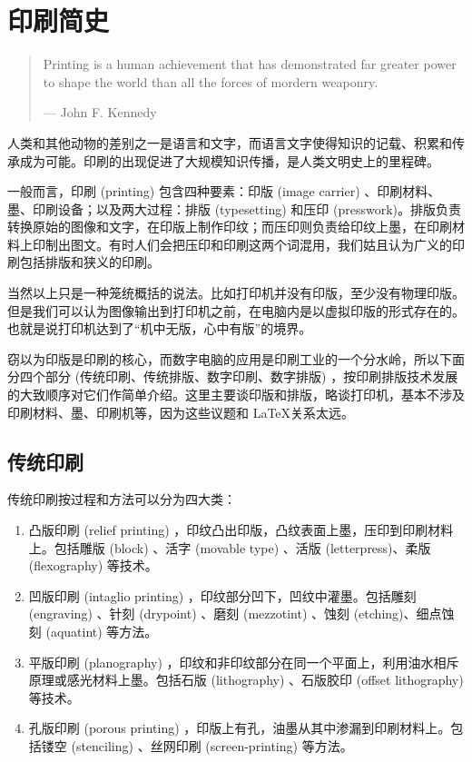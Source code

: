 \chapter{印刷简史}
\label{chap:printing}

\begin{quotation}
Printing is a human achievement that has demonstrated far greater power to shape the world than all the forces of mordern weaponry.
\begin{flushright}
    --- John F. Kennedy
\end{flushright}
\end{quotation}

人类和其他动物的差别之一是语言和文字，而语言文字使得知识的记载、积累和传承成为可能。印刷的出现促进了大规模知识传播，是人类文明史上的里程碑。

一般而言，印刷 (printing) 包含四种要素：印版 (image carrier) 、印刷材料、墨、印刷设备；以及两大过程：排版 (typesetting) 和压印 (presswork)。排版负责转换原始的图像和文字，在印版上制作印纹；而压印则负责给印纹上墨，在印刷材料上印制出图文。有时人们会把压印和印刷这两个词混用，我们姑且认为广义的印刷包括排版和狭义的印刷。

当然以上只是一种笼统概括的说法。比如打印机并没有印版，至少没有物理印版。但是我们可以认为图像输出到打印机之前，在电脑内是以虚拟印版的形式存在的。也就是说打印机达到了“机中无版，心中有版”的境界。

窃以为印版是印刷的核心，而数字电脑的应用是印刷工业的一个分水岭，所以下面分四个部分 (传统印刷、传统排版、数字印刷、数字排版) ，按印刷排版技术发展的大致顺序对它们作简单介绍。这里主要谈印版和排版，略谈打印机，基本不涉及印刷材料、墨、印刷机等，因为这些议题和 \LaTeX 关系太远。

\section{传统印刷}
传统印刷按过程和方法可以分为四大类：

\begin{enumerate}
    \item 凸版印刷 (relief printing) ，印纹凸出印版，凸纹表面上墨，压印到印刷材料上。包括雕版 (block) 、活字 (movable type) 、活版 (letterpress)、柔版 (flexography) 等技术。
    \item 凹版印刷 (intaglio printing) ，印纹部分凹下，凹纹中灌墨。包括雕刻 (engraving) 、针刻 (drypoint) 、磨刻 (mezzotint) 、蚀刻 (etching)、细点蚀刻 (aquatint)  等方法。
    \item 平版印刷 (planography) ，印纹和非印纹部分在同一个平面上，利用油水相斥原理或感光材料上墨。包括石版 (lithography) 、石版胶印 (offset lithography) 等技术。
    \item 孔版印刷 (porous printing) ，印版上有孔，油墨从其中渗漏到印刷材料上。包括镂空 (stenciling) 、丝网印刷 (screen-printing) 等方法。
\end{enumerate}

